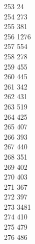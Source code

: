 { 253	24 \\
 254	273 \\
 255	381 \\
 256	1276 \\
 257	554 \\
 258	278 \\
 259	455 \\
 260	445 \\
 261	342 \\
 262	431 \\
 263	519 \\
 264	425 \\
 265	407 \\
 266	393 \\
 267	440 \\
 268	351 \\
 269	402 \\
 270	403 \\
 271	367 \\
 272	397 \\
 273	3481 \\
 274	410 \\
 275	479 \\
 276	486 \\
}
